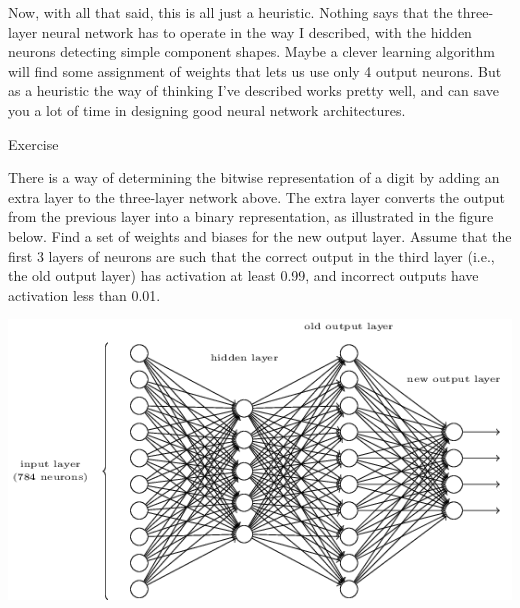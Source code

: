 \documentclass[a4paper,twoside,10pt]{book}
\begin{document}
Now, with all that said, this is all just a heuristic. Nothing says that the three-layer neural network has to operate in the way I described, with the hidden neurons detecting simple component shapes. Maybe a clever learning algorithm will find some assignment of weights that lets us use only 4 output neurons. But as a heuristic the way of thinking I've described works pretty well, and can save you a lot of time in designing good neural network architectures.


\begin{exercize}{Exercise}
	\item There is a way of determining the bitwise representation of a digit by adding an extra layer to the three-layer network above. The extra layer converts the output from the previous layer into a binary representation, as illustrated in the figure below. Find a set of weights and biases for the new output layer. Assume that the first 3 layers of neurons are such that the correct output in the third layer (i.e., the old output layer) has activation at least 0.99, and incorrect outputs have activation less than 0.01.
	\begin{center}
		\includegraphics[width=\linewidth]{./figures/ch1/tikz13}
	\end{center}
\end{exercize}
\end{document}
